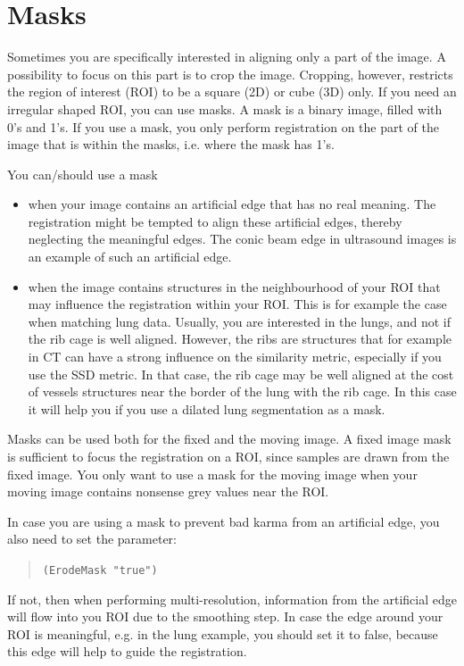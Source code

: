 \documentclass[]{report}
\begin{document}
\section{Masks}

Sometimes you are specifically interested in aligning only a part of
the image. A possibility to focus on this part is to crop the image.
Cropping, however, restricts the region of interest (ROI) to be a
square (2D) or cube (3D) only. If you need an irregular shaped ROI,
you can use masks. A mask is a binary image, filled with 0's and 1's.
If you use a mask, you only perform registration on the part of the
image that is within the masks, i.e. where the mask has 1's.

You can/should use a mask
\begin{itemize}
\item when your image contains an artificial edge that has no real meaning.
The registration might be tempted to align these artificial edges,
thereby neglecting the meaningful edges. The conic beam edge in
ultrasound images is an example of such an artificial edge.

\item when the image contains structures in the neighbourhood
of your ROI that may influence the registration within your ROI. This
is for example the case when matching lung data. Usually, you are
interested in the lungs, and not if the rib cage is well aligned.
However, the ribs are structures that for example in CT can have a
strong influence on the similarity metric, especially if you use the
SSD metric. In that case, the rib cage may be well aligned at the
cost of vessels structures near the border of the lung with the rib
cage. In this case it will help you if you use a dilated lung
segmentation as a mask.
\end{itemize}

Masks can be used both for the fixed and the moving image. A fixed
image mask is sufficient to focus the registration on a ROI, since
samples are drawn from the fixed image. You only want to use a
mask for the moving image when your moving image contains nonsense
grey values near the ROI.

In case you are using a mask to prevent bad karma from an artificial
edge, you also need to set the parameter:
\begin{quote}
\texttt{(ErodeMask "true")}
\end{quote}
If not, then when performing multi-resolution, information from the
artificial edge will flow into you ROI due to the smoothing step. In
case the edge around your ROI is meaningful, e.g. in the lung
example, you should set it to false, because this edge will help to
guide the registration.
\end{document}
